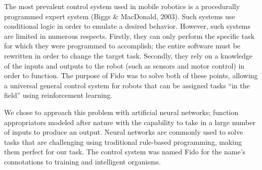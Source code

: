 The most prevalent control system used in mobile robotics is a procedurally programmed expert system (Biggs \& MacDonald, 2003).  Such systems use conditional logic in order to emulate a desired behavior.  However, such systems are limited in numerous respects.  Firstly, they can only perform the specific task for which they were programmed to accomplish; the entire software must be rewritten in order to change the target task.  Secondly, they rely on a knowledge of the inputs and outputs to the robot (such as sensors and motor control) in order to function.  The purpose of Fido was to solve both of these points, allowing a universal general control system for robots that can be assigned tasks ``in the field'' using reinforcement learning.  

We chose to approach this problem with artificial neural networks; function appropriators modeled after nature with the capability to take in a large number of inputs to produce an output.  Neural networks are commonly used to solve tasks that are challenging using traditional rule-based programming, making them perfect for our task.  The control system was named Fido for the name's connotations to training and intelligent organisms. 